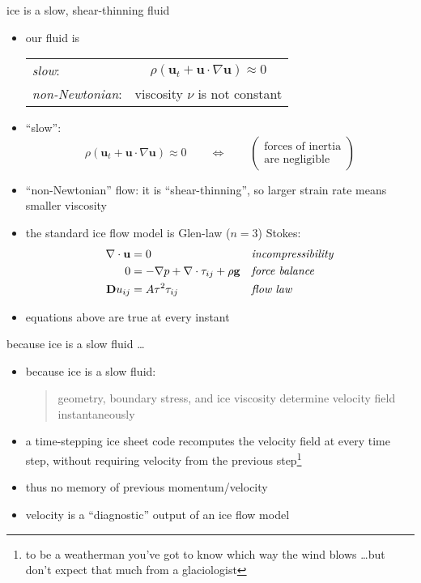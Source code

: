 \documentclass[hide notes,intlimits]{beamer}
\begin{document}
\begin{frame}{ice is a slow, shear-thinning fluid}

\begin{itemize}
\item our fluid is

  \begin{tabular}{lc}
  \emph{slow}: & $\rho \left(\mathbf{u}_t + \mathbf{u}\cdot\nabla \mathbf{u}\right) \approx 0$ \\
  \emph{non-Newtonian}: & viscosity $\nu$ is not constant
  \end{tabular}
\item ``slow'':
  $$\rho \left(\mathbf{u}_t + \mathbf{u}\cdot\nabla \mathbf{u}\right) \approx 0 \qquad \iff \qquad \begin{pmatrix} \text{forces of inertia} \\ \text{are negligible} \end{pmatrix}$$
\item ``non-Newtonian'' flow:  it is ``shear-thinning'', so larger strain rate means smaller viscosity
\item the standard ice flow model is Glen-law ($n=3$) Stokes:
\begin{align*}
\nabla \cdot \mathbf{u} &= 0 &&\text{\emph{incompressibility}} \\
0 &= - \nabla p + \nabla \cdot \tau_{ij} + \rho \mathbf{g} &&\text{\emph{force balance}} \\
\mathbf{D}u_{ij} &= A \tau^2 \tau_{ij} &&\text{\emph{flow law}}
\end{align*}
\item equations above are true at every instant
\end{itemize}
\end{frame}


\begin{frame}{because ice is a slow fluid \dots}

\begin{itemize}
\item because ice is a slow fluid:
  \begin{quote}
  \alert{geometry, boundary stress, and ice viscosity determine velocity field instantaneously}
  \end{quote}
\item a time-stepping ice sheet code recomputes the velocity field at every time step, without requiring velocity from the previous step\footnote{to be a weatherman you've got to know which way the wind blows \dots but don't expect that much from a glaciologist}
\item thus no memory of previous momentum/velocity
\item velocity is a ``diagnostic'' output of an ice flow model
\end{itemize}
\end{frame}
\end{document}
